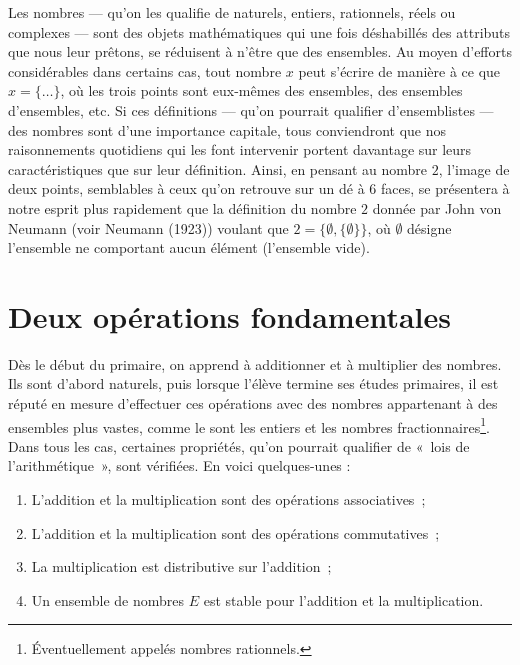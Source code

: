 \documentclass[
  letterpaper,
  DIV=11,
  numbers=noendperiod,
  oneside]{scrreprt}
\providecommand{\tightlist}{%
  \setlength{\itemsep}{0pt}\setlength{\parskip}{0pt}}\usepackage{longtable,booktabs,array}
\theoremstyle{definition}
\theoremstyle{remark}
\begin{document}
Les nombres --- qu'on les qualifie de naturels, entiers, rationnels,
réels ou complexes --- sont des objets mathématiques qui une fois
déshabillés des attributs que nous leur prêtons, se réduisent à n'être
que des ensembles. Au moyen d'efforts considérables dans certains cas,
tout nombre \(x\) peut s'écrire de manière à ce que \(x=\{\ldots\}\), où
les trois points sont eux-mêmes des ensembles, des ensembles
d'ensembles, etc. Si ces définitions --- qu'on pourrait qualifier
d'ensemblistes --- des nombres sont d'une importance capitale, tous
conviendront que nos raisonnements quotidiens qui les font intervenir
portent davantage sur leurs caractéristiques que sur leur définition.
Ainsi, en pensant au nombre \(2\), l'image de deux points, semblables à
ceux qu'on retrouve sur un dé à 6 faces, se présentera à notre esprit
plus rapidement que la définition du nombre \(2\) donnée par John von
Neumann (voir Neumann (1923)) voulant que
\(2=\{\emptyset,\{\emptyset\}\}\), où \(\emptyset\) désigne l'ensemble
ne comportant aucun élément (l'ensemble vide).

\hypertarget{deux-opuxe9rations-fondamentales}{%
\section{Deux opérations
fondamentales}\label{deux-opuxe9rations-fondamentales}}

Dès le début du primaire, on apprend à additionner et à multiplier des
nombres. Ils sont d'abord naturels, puis lorsque l'élève termine ses
études primaires, il est réputé en mesure d'effectuer ces opérations
avec des nombres appartenant à des ensembles plus vastes, comme le sont
les entiers et les nombres fractionnaires\footnote{Éventuellement
  appelés nombres rationnels.}. Dans tous les cas, certaines propriétés,
qu'on pourrait qualifier de «~lois de l'arithmétique~», sont vérifiées.
En voici quelques-unes :

\begin{enumerate}
\def\labelenumi{\arabic{enumi}.}
\tightlist
\item
  L'addition et la multiplication sont des opérations associatives~;
\item
  L'addition et la multiplication sont des opérations commutatives~;
\item
  La multiplication est distributive sur l'addition~;
\item
  Un ensemble de nombres \(E\) est stable pour l'addition et la
  multiplication.
\end{enumerate}
\end{document}
